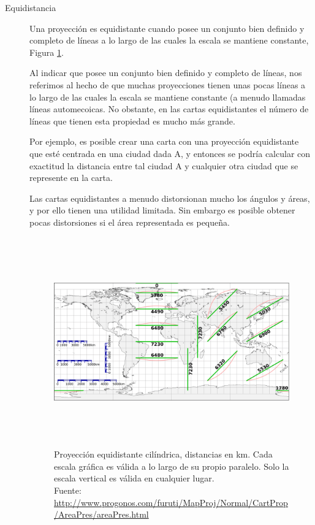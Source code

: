 \documentclass[a4paper,12pt,twoside]{article}
\begin{document}
\begin{description}
\item[Equidistancia] Una proyección es equidistante cuando posee un conjunto bien definido y completo de líneas a lo largo de las cuales la escala se mantiene constante, Figura \ref{fig:proyeccion.equidistante}.

Al indicar que posee un conjunto bien definido y completo de líneas, nos referimos al hecho de que muchas proyecciones tienen unas pocas líneas a lo largo de las cuales la escala se mantiene constante (a menudo llamadas líneas automecoicas. No obstante, en las cartas equidistantes el número de líneas que tienen esta propiedad es mucho más grande.

Por ejemplo, es posible crear una carta con una proyección equidistante que esté centrada en una ciudad dada A, y entonces se podría calcular con exactitud la distancia entre tal ciudad A y cualquier otra ciudad que se represente en la carta.

Las cartas equidistantes a menudo distorsionan mucho los ángulos y áreas, y por ello tienen una utilidad limitada. Sin embargo es posible obtener pocas distorsiones si el área representada es pequeña. 

    \begin{figure}[!h]
      \centering
  \includegraphics[height=9cm]{./Imagenes/proyeccion-equidistante.png}
      \caption{Proyecci\'on equidistante cil\'indrica, distancias en km. Cada escala gr\'afica es v\'alida a lo largo de su propio paralelo. Solo la escala vertical es v\'alida en cualquier lugar.\\{\footnotesize Fuente: \url{http://www.progonos.com/furuti/MapProj/Normal/CartProp/AreaPres/areaPres.html}}}
      \label{fig:proyeccion.equidistante}
    \end{figure}



\end{description}
\end{document}
